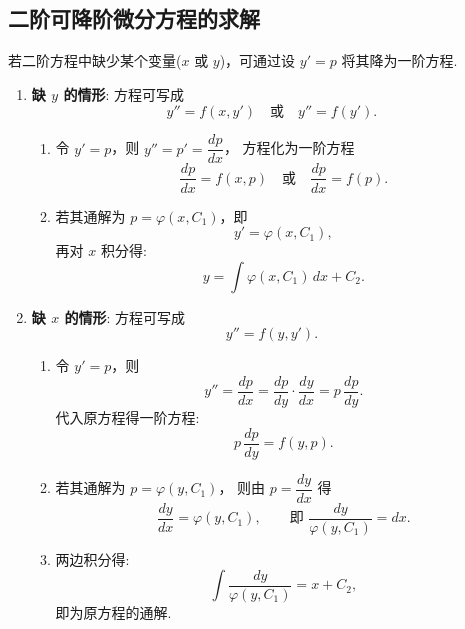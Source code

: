 \subsection{二阶可降阶微分方程的求解}
\DTwoThree

若二阶方程中缺少某个变量($x$ 或 $y$)，可通过设 $y' = p$ 将其降为一阶方程.

\begin{enumerate}
    \item \textbf{缺 $y$ 的情形}:
          方程可写成
          \[
              y'' = f(x, y') \quad \text{或} \quad y'' = f(y').
          \]
          \begin{enumerate}[label=(\roman*)]
              \item 令 $y' = p$，则 $y'' = p' = \dfrac{dp}{dx}$，
                    方程化为一阶方程
                    \[
                        \frac{dp}{dx} = f(x, p)
                        \quad \text{或} \quad
                        \frac{dp}{dx} = f(p).
                    \]
              \item 若其通解为 $p = \varphi(x, C_1)$，即
                    \[
                        y' = \varphi(x, C_1),
                    \]
                    再对 $x$ 积分得:
                    \[
                        \boxed{
                            y = \int \varphi(x, C_1)\,dx + C_2.
                        }
                    \]
          \end{enumerate}

    \item \textbf{缺 $x$ 的情形}:
          方程可写成
          \[
              y'' = f(y, y').
          \]
          \begin{enumerate}[label=(\roman*)]
              \item 令 $y' = p$，则
                    \[
                        y'' = \frac{dp}{dx}
                        = \frac{dp}{dy} \cdot \frac{dy}{dx}
                        = p\,\frac{dp}{dy}.
                    \]
                    代入原方程得一阶方程:
                    \[
                        p\,\frac{dp}{dy} = f(y, p).
                    \]
              \item 若其通解为 $p = \varphi(y, C_1)$，
                    则由 $p = \dfrac{dy}{dx}$ 得
                    \[
                        \frac{dy}{dx} = \varphi(y, C_1),
                        \qquad
                        \text{即 } \frac{dy}{\varphi(y, C_1)} = dx.
                    \]
              \item 两边积分得:
                    \[
                        \boxed{
                            \int \frac{dy}{\varphi(y, C_1)} = x + C_2,
                        }
                    \]
                    即为原方程的通解.
          \end{enumerate}
\end{enumerate}

